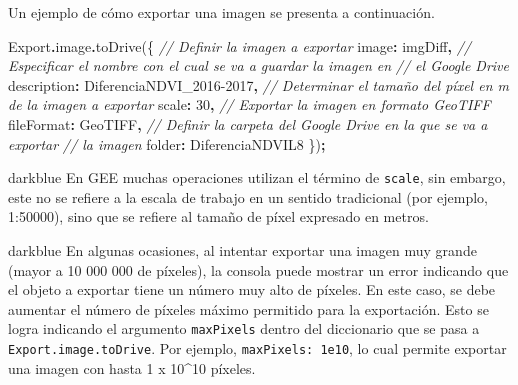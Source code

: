 \documentclass[
  12pt,
  letterpaper,
  twoside]{book}
\newenvironment{Shaded}{\begin{snugshade}}{\end{snugshade}}
\newcommand{\AttributeTok}[1]{\textcolor[rgb]{0.77,0.63,0.00}{#1}}
\newcommand{\CommentTok}[1]{\textcolor[rgb]{0.56,0.35,0.01}{\textit{#1}}}
\newcommand{\DataTypeTok}[1]{\textcolor[rgb]{0.13,0.29,0.53}{#1}}
\newcommand{\DecValTok}[1]{\textcolor[rgb]{0.00,0.00,0.81}{#1}}
\newcommand{\FunctionTok}[1]{\textcolor[rgb]{0.00,0.00,0.00}{#1}}
\newcommand{\NormalTok}[1]{#1}
\newcommand{\OperatorTok}[1]{\textcolor[rgb]{0.81,0.36,0.00}{\textbf{#1}}}
\newcommand{\StringTok}[1]{\textcolor[rgb]{0.31,0.60,0.02}{#1}}
\begin{document}
Un ejemplo de cómo exportar una imagen se presenta a continuación.

\begin{Shaded}
\begin{Highlighting}[]
\NormalTok{Export}\OperatorTok{.}\AttributeTok{image}\OperatorTok{.}\FunctionTok{toDrive}\NormalTok{(\{}
  \CommentTok{// Definir la imagen a exportar}
  \DataTypeTok{image}\OperatorTok{:}\NormalTok{ imgDiff}\OperatorTok{,}
  \CommentTok{// Especificar el nombre con el cual se va a guardar la imagen en}
  \CommentTok{// el Google Drive}
  \DataTypeTok{description}\OperatorTok{:} \StringTok{\textquotesingle{}DiferenciaNDVI\_2016{-}2017\textquotesingle{}}\OperatorTok{,}
  \CommentTok{// Determinar el tamaño del píxel en m de la imagen a exportar}
  \DataTypeTok{scale}\OperatorTok{:} \DecValTok{30}\OperatorTok{,}
  \CommentTok{// Exportar la imagen en formato GeoTIFF}
  \DataTypeTok{fileFormat}\OperatorTok{:} \StringTok{\textquotesingle{}GeoTIFF\textquotesingle{}}\OperatorTok{,}
  \CommentTok{// Definir la carpeta del Google Drive en la que se va a exportar}
  \CommentTok{// la imagen}
  \DataTypeTok{folder}\OperatorTok{:} \StringTok{\textquotesingle{}DiferenciaNDVIL8\textquotesingle{}}
\NormalTok{\})}\OperatorTok{;} 
\end{Highlighting}
\end{Shaded}

\begin{bluebox2}

\begin{awesomeblock}{5pt}{\faLightbulb}{darkblue}
En GEE muchas operaciones utilizan el término de \texttt{scale}, sin embargo, este no se refiere a la escala de trabajo en un sentido tradicional (por ejemplo, 1:50000), sino que se refiere al tamaño de píxel expresado en metros.

\end{awesomeblock}

\end{bluebox2}

\begin{bluebox2}

\begin{awesomeblock}{5pt}{\faLightbulb}{darkblue}
En algunas ocasiones, al intentar exportar una imagen muy grande (mayor a 10 000 000 de píxeles), la consola puede mostrar un error indicando que el objeto a exportar tiene un número muy alto de píxeles. En este caso, se debe aumentar el número de píxeles máximo permitido para la exportación. Esto se logra indicando el argumento \texttt{maxPixels} dentro del diccionario que se pasa a \texttt{Export.image.toDrive}. Por ejemplo, \texttt{maxPixels:\ 1e10}, lo cual permite exportar una imagen con hasta 1 x 10\^{}10 píxeles.

\end{awesomeblock}

\end{bluebox2}
\end{document}
